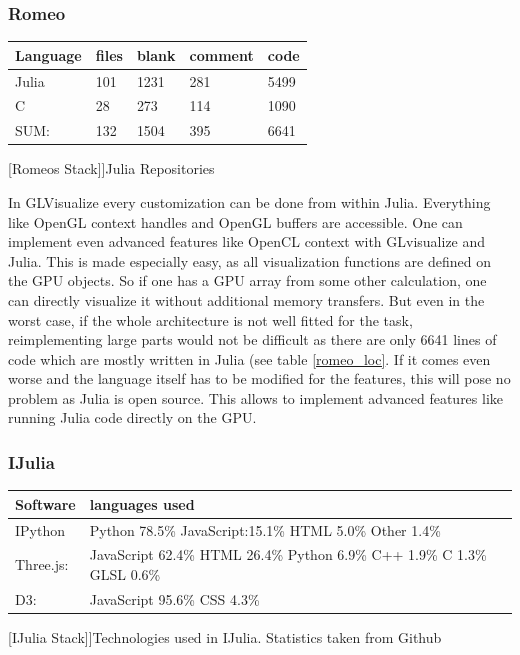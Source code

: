 \subsubsection{Romeo}

\begin{table}[htbp]
    \centering
    \begin{tabular}{l|l|l|l|l}
        \hline
        \textbf{Language} & \textbf{files}    &   \textbf{blank}   &   \textbf{comment}    &  \textbf{code}\\
        \hline
        Julia  &  101   &    1231 &   281  &  5499\\
        C       &   28  &   273   &    114 &  1090\\
        \hline
        SUM: & 132  &  1504  &     395    &   6641\\
        \hline
    \end{tabular}
    [Romeos Stack]]{Julia Repositories}
    \label{table:romeo_loc}
\end{table}

In GLVisualize every customization can be done from within Julia.
Everything like \ac{OpenGL} context handles and \ac{OpenGL} buffers are accessible.
One can implement even advanced features like \ac{OpenCL} context with GLvisualize and Julia.
This is made especially easy, as all visualization functions are defined on the \ac{GPU} objects. So if one has a \ac{GPU} array from some other calculation, one can directly visualize it without additional memory transfers.
But even in the worst case, if the whole architecture is not well fitted for the task, reimplementing large parts would not be difficult as there are only 6641 lines of code which are mostly written in Julia (see table \ref{romeo_loc}.
If it comes even worse and the language itself has to be modified for the features, this will pose no problem as Julia is open source.
This allows to implement advanced features like running Julia code directly on the \ac{GPU}.


\subsubsection{IJulia}


\begin{table}[htbp]
    \centering
    \begin{tabular}{l|l}
        \hline
        \textbf{Software} & \textbf{languages used}\\
        \hline
        IPython     & Python 78.5\% JavaScript:15.1\% HTML 5.0\% Other 1.4\%\\
        Three.js:   & JavaScript 62.4\% HTML 26.4\% Python 6.9\% C++ 1.9\% C 1.3\% GLSL 0.6\%\\
        D3:         & JavaScript 95.6\% CSS 4.3\%\\
        \hline
    \end{tabular}
    [IJulia Stack]]{Technologies used in IJulia. Statistics taken from Github}
    \label{table:ijuliastack}
\end{table}

